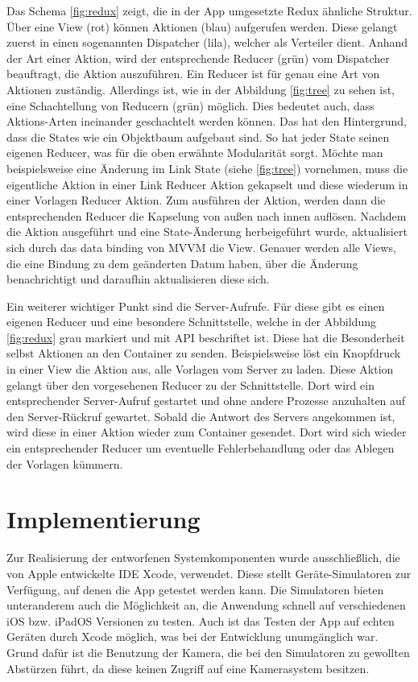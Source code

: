 \documentclass[nomenclature, oneside, 150]{HSMW-Thesis}
\begin{document}
		Das Schema \ref{fig:redux} zeigt, die in der App umgesetzte Redux ähnliche Struktur. Über eine View (rot) können Aktionen (blau) aufgerufen werden. Diese gelangt zuerst in einen sogenannten Dispatcher (lila), welcher als Verteiler dient. Anhand der Art einer Aktion, wird der entsprechende Reducer (grün) vom Dispatcher beauftragt, die Aktion auszuführen. Ein Reducer ist für genau eine Art von Aktionen zuständig. Allerdings ist, wie in der Abbildung \ref{fig:tree} zu sehen ist, eine Schachtellung von Reducern (grün) möglich. Dies bedeutet auch, dass Aktions-Arten ineinander geschachtelt werden können. Das hat den Hintergrund, dass die States wie ein Objektbaum aufgebaut sind. So hat jeder State seinen eigenen Reducer, was für die oben erwähnte Modularität sorgt. Möchte man beispielsweise eine Änderung im Link State (siehe \ref{fig:tree}) vornehmen, muss die eigentliche Aktion in einer Link Reducer Aktion gekapselt und diese wiederum in einer Vorlagen Reducer Aktion. Zum ausführen der Aktion, werden dann die entsprechenden Reducer die Kapselung von außen nach innen auflösen. Nachdem die Aktion ausgeführt und eine State-Änderung herbeigeführt wurde, aktualisiert sich durch das data binding von MVVM die View. Genauer werden alle Views, die eine Bindung zu dem geänderten Datum haben, über die Änderung benachrichtigt und daraufhin aktualisieren diese sich.

		Ein weiterer wichtiger Punkt sind die Server-Aufrufe. Für diese gibt es einen eigenen Reducer und eine besondere Schnittstelle, welche in der Abbildung \ref{fig:redux} grau markiert und mit API  beschriftet ist. Diese hat die Besonderheit selbst Aktionen an den Container zu senden. Beispielsweise löst ein Knopfdruck in einer View die Aktion aus, alle Vorlagen vom Server zu laden. Diese Aktion gelangt über den vorgesehenen Reducer zu der Schnittstelle. Dort wird ein entsprechender Server-Aufruf gestartet und ohne andere Prozesse anzuhalten auf den Server-Rückruf gewartet. Sobald die Antwort des Servers angekommen ist, wird diese in einer Aktion wieder zum Container gesendet. Dort wird sich wieder ein entsprechender Reducer um eventuelle Fehlerbehandlung oder das Ablegen der Vorlagen kümmern.
		
	\section{Implementierung}
		
		Zur Realisierung der entworfenen Systemkomponenten wurde ausschließlich, die von Apple entwickelte IDE Xcode, verwendet. Diese stellt Geräte-Simulatoren zur Verfügung, auf denen die App getestet werden kann. Die Simulatoren bieten unteranderem auch die Möglichkeit an, die Anwendung schnell auf verschiedenen iOS bzw. iPadOS Versionen zu testen. Auch ist das Testen der App auf echten Geräten durch Xcode möglich, was bei der Entwicklung unumgänglich war. Grund dafür ist die Benutzung der Kamera, die bei den Simulatoren zu gewollten Abstürzen führt, da diese keinen Zugriff auf eine Kamerasystem besitzen. 
		
\end{document}
